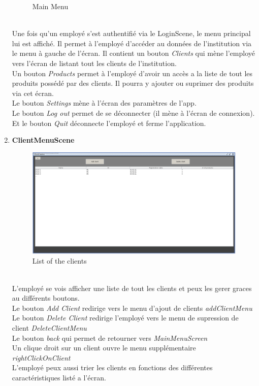 \documentclass[../rapport.tex]{subfiles}
\begin{document}
\begin{enumerate}
\begin{figure}[h!]
				\caption{Main Menu}
		\end{figure}
		\\
Une fois qu'un employé s'est authentifié via le LoginScene, le menu principal lui est affiché. Il permet à l'employé d'accéder au données de l'institution via le menu à 
gauche de l'écran. Il contient un bouton \textit{Clients} qui mène l'employé vers l'écran de listant tout les clients de l'institution.\\
Un bouton \textit{Products} permet à l'employé d'avoir un accès a la liste de tout les produits possédé par des clients. Il pourra y ajouter ou suprimer des produits via cet écran.\\
Le bouton \textit{Settings} mène à l'écran des paramètres de l'app.\\
Le bouton \textit{Log out} permet de se déconnecter (il mène à l'écran de connexion).\\
Et le bouton \textit{Quit} déconnecte l'employé et ferme l'application.
\newpage
\item \textbf{ClientMenuScene} \\
		\begin{figure}[h!]
				\centering \includegraphics[scale=0.2]{ressources/photos_diagrammes/app2/gui/Clients menu scene.jpg}
				\caption{List of the clients}
		\end{figure}
		\\
L'employé se vois afficher une liste de tout les clients et peux les gerer graces au différents boutons.\\
Le bouton \textit{Add Client} redirige vers le menu d'ajout de clients \textit{addClientMenu}\\
Le bouton \textit{Delete Client} redirige l'employé vers  le menu de supression de client \textit{DeleteClientMenu}\\
Le bouton \textit{back} qui permet de retourner vers \textit{MainMenuScreen}\\
Un clique droit sur un client ouvre le menu supplémentaire \textit{rightClickOnClient}\\
L'employé peux aussi trier les clients en fonctions des différentes caractéristiques listé a l'écran.\\


\end{enumerate}
\end{document}

